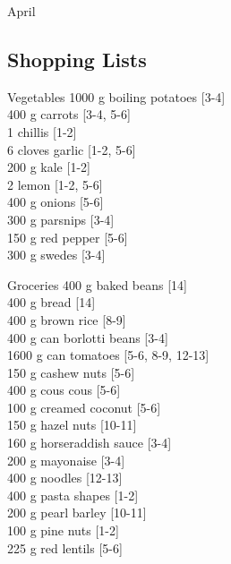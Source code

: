 \begin{menu}{April}
    \subsection*{Shopping Lists}
      \begin{shoppinglist}{Vegetables}
      1000 g boiling potatoes {\scriptsize[3-4]}\\
      400 g carrots {\scriptsize[3-4, 5-6]}\\
      1  chillis {\scriptsize[1-2]}\\
      6 cloves garlic {\scriptsize[1-2, 5-6]}\\
      200 g kale {\scriptsize[1-2]}\\
      2  lemon {\scriptsize[1-2, 5-6]}\\
      400 g onions {\scriptsize[5-6]}\\
      300 g parsnips {\scriptsize[3-4]}\\
      150 g red pepper {\scriptsize[5-6]}\\
      300 g swedes {\scriptsize[3-4]}\\
      \end{shoppinglist}%
      \begin{shoppinglist}{Groceries}
      400 g baked beans {\scriptsize[14]}\\
      400 g bread {\scriptsize[14]}\\
      400 g brown rice {\scriptsize[8-9]}\\
      400 g can borlotti beans {\scriptsize[3-4]}\\
      1600 g can tomatoes {\scriptsize[5-6, 8-9, 12-13]}\\
      150 g cashew nuts {\scriptsize[5-6]}\\
      400 g cous cous {\scriptsize[5-6]}\\
      100 g creamed coconut {\scriptsize[5-6]}\\
      150 g hazel nuts {\scriptsize[10-11]}\\
      160 g horseraddish sauce {\scriptsize[3-4]}\\
      200 g mayonaise {\scriptsize[3-4]}\\
      400 g noodles {\scriptsize[12-13]}\\
      400 g pasta shapes {\scriptsize[1-2]}\\
      200 g pearl barley {\scriptsize[10-11]}\\
      100 g pine nuts {\scriptsize[1-2]}\\
      225 g red lentils {\scriptsize[5-6]}\\

\end{shoppinglist}
\end{menu}
